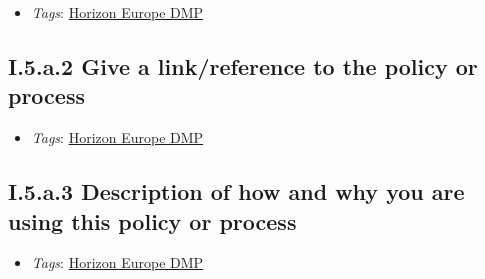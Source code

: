 \documentclass[a4paper,12pt]{report}
\begin{document}
\begin{itemize}
  \item \textit{Tags}: \ul{Horizon Europe DMP}
  \end{itemize}





\subsection*{\protect\textcolor{colorSecId}{I.5.a.2} Give a link/reference to the policy or process}

\label{1e85da40-bbfc-4180-903e-6c569ed2da38.87964502-4401-45e5-9084-d6c84a417acf.98627fd2-543a-44cc-9027-b325999767b1.e13bf3cb-cf78-486e-b844-2c12320919c4}


\begin{itemize}
  \item \textit{Tags}: \ul{Horizon Europe DMP}
  \end{itemize}





\subsection*{\protect\textcolor{colorSecId}{I.5.a.3} Description of how and why you are using this policy or process}

\label{1e85da40-bbfc-4180-903e-6c569ed2da38.87964502-4401-45e5-9084-d6c84a417acf.98627fd2-543a-44cc-9027-b325999767b1.c730b703-82cf-4a0e-a1dc-d910d73d1ed9}


\begin{itemize}
  \item \textit{Tags}: \ul{Horizon Europe DMP}
  \end{itemize}
\end{document}
